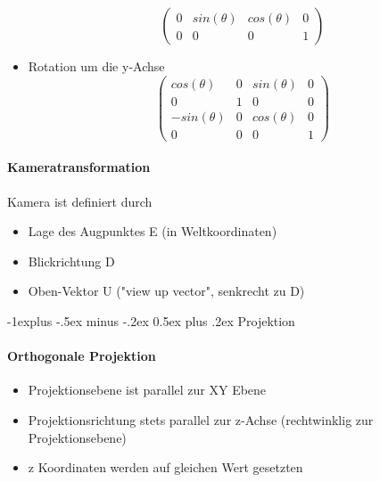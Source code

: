 \documentclass[10pt,landscape]{article}
\makeatletter
\renewcommand{\subsection}{\@startsection{subsection}{2}{0mm}%
                                {-1explus -.5ex minus -.2ex}%
                                {0.5ex plus .2ex}%
                                {\normalfont\normalsize\bfseries}}
\makeatother
\begin{document}
\begin{multicols}{3}
\begin{itemize}
$$\begin{pmatrix}
            0 & sin(\theta) & cos(\theta)  & 0 \\
            0 & 0           & 0            & 1
          \end{pmatrix}$$
  \item Rotation um die y-Achse
        $$\begin{pmatrix}
            cos(\theta)  & 0 & sin(\theta) & 0 \\
            0            & 1 & 0           & 0 \\ 
            -sin(\theta) & 0 & cos(\theta) & 0 \\
            0            & 0 & 0           & 1
          \end{pmatrix}$$
\end{itemize}

\paragraph{Kameratransformation}
Kamera ist definiert durch
\begin{itemize}
  \item Lage des Augpunktes E (in Weltkoordinaten)
  \item Blickrichtung D
  \item Oben-Vektor U ("view up vector", senkrecht zu D)
\end{itemize}

\subsection{Projektion}
\paragraph{Orthogonale Projektion}
\begin{itemize}
  \item Projektionsebene ist parallel zur XY Ebene
  \item Projektionsrichtung stets parallel zur z-Achse (rechtwinklig zur Projektionsebene)
  \item z Koordinaten werden auf gleichen Wert gesetzten
\end{itemize}


\end{multicols}
\end{document}
